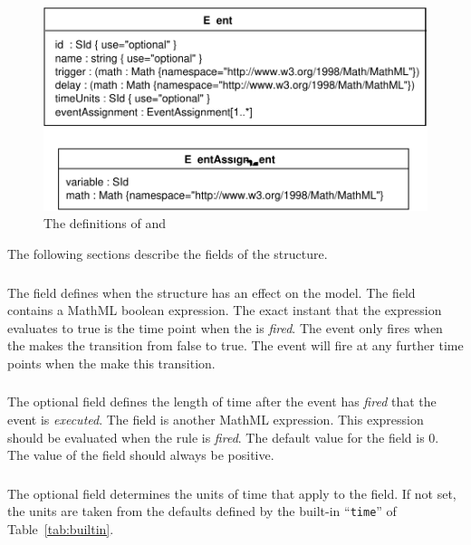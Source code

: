 \documentclass[10pt]{cekarticle}
\newcommand{\vref}[1]{\ref{#1}}
\begin{document}
\begin{figure}[htb]
  \centering
  \includegraphics[scale = 0.68]{event}
  \caption{The definitions of  and }
  \label{fig:event}
\end{figure}

The following sections describe the fields of the 
structure.

\subsubsection{}
The  field defines when the 
structure has an effect on the model.  The  field
contains a MathML boolean expression.  The exact instant that the
expression evaluates to true is the time point when the
 is \emph{fired}.  The event only fires when the
 makes the transition from false to true.  The
event will fire at any further time points when the
 make this transition.

\subsubsection{}
The optional  field defines the length of time after
the event has \emph{fired} that the event is \emph{executed}. The
 field is another MathML expression.  This
expression should be evaluated when the rule is \emph{fired}.  The
default value for the  field is 0.  The value of the
 field should always be positive.

\subsubsection{}
The optional field  determines the units of time
that apply to the  field. If not set, the units are
taken from the defaults defined by the built-in ``\texttt{time}''
of Table~\vref{tab:builtin}.
\end{document}
